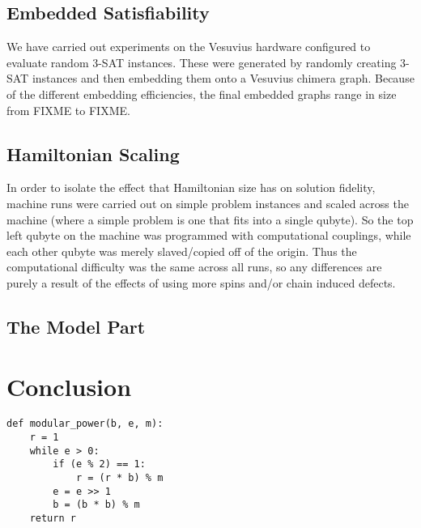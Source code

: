 \documentclass{article}
\begin{document}
\subsection{Embedded Satisfiability}

We have carried out experiments on the Vesuvius hardware configured to evaluate random 3-SAT instances.  These were generated by randomly creating 3-SAT instances and then embedding them onto a Vesuvius chimera graph.  Because of the different embedding efficiencies, the final embedded graphs range in size from FIXME to FIXME.  

\subsection{Hamiltonian Scaling}

In order to isolate the effect that Hamiltonian size has on solution fidelity, machine runs were carried out on simple problem instances and scaled across the machine (where a simple problem is one that fits into a single qubyte).  So the top left qubyte on the machine was programmed with computational couplings, while each other qubyte was merely slaved/copied off of the origin.  Thus the computational difficulty was the same across all runs, so any differences are purely a result of the effects of using more spins and/or chain induced defects.

\subsection{The Model Part}

\section{Conclusion}

\begin{lstlisting}
def modular_power(b, e, m):
	r = 1
	while e > 0:
		if (e % 2) == 1:
			r = (r * b) % m
		e = e >> 1
		b = (b * b) % m
	return r
\end{lstlisting}

{}

\end{document}
